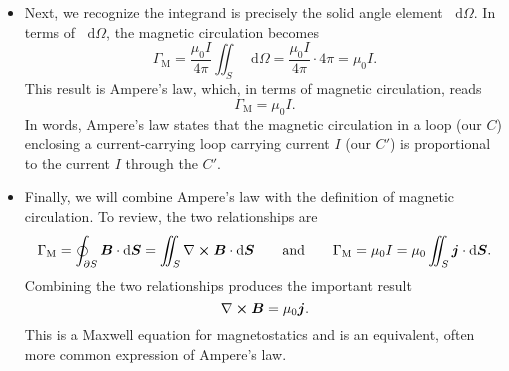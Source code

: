\documentclass[11pt, a4paper]{article}
\newcommand{\diff}{\mathop{}\!\mathrm{d}} %
\newcommand{\eqtext}[1]{\qquad \text{#1} \qquad}
\renewcommand{\vec}[1]{\bm{#1}} %
\newcommand{\B}{\vec{B}} %
\newcommand{\mm}{\mu_{0}}  %
\renewcommand{\j}{\vec{j}}  %
\renewcommand{\curl}{\nabla \cross}
\begin{document}
\begin{itemize}
    \item Next, we recognize the integrand is precisely the solid angle element $ \diff \Omega $. In terms of $ \diff \Omega $, the magnetic circulation becomes
	\begin{equation*}
		\Gamma_{\text{M}} = \frac{\mm I}{4\pi} \iint_{S} \diff \Omega =  \frac{\mm I}{4\pi}  \cdot 4 \pi = \mm I.
	\end{equation*}
	This result is Ampere's law, which, in terms of magnetic circulation, reads
	\begin{equation*}
		\Gamma_{\text{M}} = \mm I.
	\end{equation*}
    In words, Ampere's law states that the magnetic circulation in a loop (our $ C $) enclosing a current-carrying loop carrying current $ I $ (our $ C' $) is proportional to the current $ I $ through the $ C' $.
	
	\item Finally, we will combine Ampere's law with the definition of magnetic circulation. To review, the two relationships are
	\begin{equation*}
		\Gamma_{\text{M}} = \oint_{\partial S} \B \cdot \diff \vec{S} = \iint_{S} \curl \B \cdot \diff \vec{S} \eqtext{and} \Gamma_{\text{M}} = \mm I = \mm \iint_{S} \j \cdot \diff \vec{S}.
	\end{equation*}
    Combining the two relationships produces the important result
	\begin{equation*}
		\curl \B = \mm \j.
	\end{equation*}
	This is a Maxwell equation for magnetostatics and is an equivalent, often more common expression of Ampere's law.
	
\end{itemize}
\end{document}
